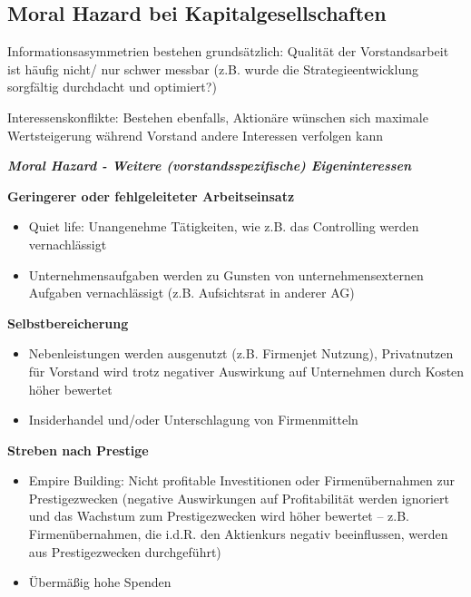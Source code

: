 \documentclass[
]{article}
\providecommand{\tightlist}{%
  \setlength{\itemsep}{0pt}\setlength{\parskip}{0pt}}
\begin{document}
\hypertarget{moral-hazard-bei-kapitalgesellschaften}{%
\subsection{Moral Hazard bei
Kapitalgesellschaften}\label{moral-hazard-bei-kapitalgesellschaften}}

Informationsasymmetrien bestehen grundsätzlich: Qualität der
Vorstandsarbeit ist häufig nicht/ nur schwer messbar (z.B. wurde die
Strategieentwicklung sorgfältig durchdacht und optimiert?)

Interessenskonflikte: Bestehen ebenfalls, Aktionäre wünschen sich
maximale Wertsteigerung während Vorstand andere Interessen verfolgen
kann

\textbf{\emph{Moral Hazard - Weitere (vorstandsspezifische)
Eigeninteressen}}

\textbf{Geringerer oder fehlgeleiteter Arbeitseinsatz}

\begin{itemize}
\tightlist
\item
  Quiet life: Unangenehme Tätigkeiten, wie z.B. das Controlling werden
  vernachlässigt
\item
  Unternehmensaufgaben werden zu Gunsten von unternehmensexternen
  Aufgaben vernachlässigt (z.B. Aufsichtsrat in anderer AG)
\end{itemize}

\textbf{Selbstbereicherung}

\begin{itemize}
\tightlist
\item
  Nebenleistungen werden ausgenutzt (z.B. Firmenjet Nutzung),
  Privatnutzen für Vorstand wird trotz negativer Auswirkung auf
  Unternehmen durch Kosten höher bewertet
\item
  Insiderhandel und/oder Unterschlagung von Firmenmitteln
\end{itemize}

\textbf{Streben nach Prestige}

\begin{itemize}
\tightlist
\item
  Empire Building: Nicht profitable Investitionen oder Firmenübernahmen
  zur Prestigezwecken (negative Auswirkungen auf Profitabilität werden
  ignoriert und das Wachstum zum Prestigezwecken wird höher bewertet --
  z.B. Firmenübernahmen, die i.d.R. den Aktienkurs negativ beeinflussen,
  werden aus Prestigezwecken durchgeführt)
\item
  Übermäßig hohe Spenden
\end{itemize}
\end{document}
